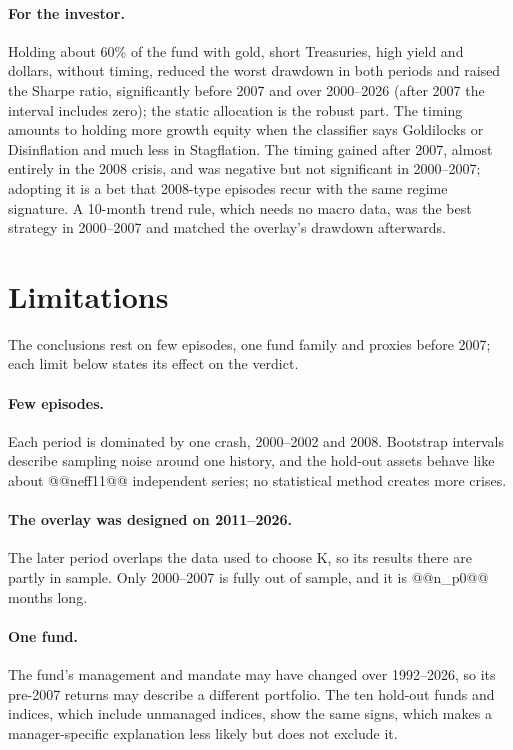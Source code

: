\documentclass[11pt,a4paper]{article}
\begin{document}
\paragraph{For the investor.} Holding about 60\% of the fund with gold, short Treasuries, high yield and dollars,
without timing, reduced the worst drawdown in both periods and raised the Sharpe ratio, significantly before
2007 and over 2000--2026 (after 2007 the interval includes zero); the static allocation is the robust part.
The timing amounts to holding more growth equity when the classifier says Goldilocks or Disinflation and much less in Stagflation. The timing gained after 2007, almost entirely in the 2008 crisis, and was negative but not significant in 2000--2007; adopting it is a bet that 2008-type episodes recur with the same regime signature. A 10-month trend rule, which needs no macro data, was the best strategy in
2000--2007 and matched the overlay's drawdown afterwards.

\section{Limitations}

The conclusions rest on few episodes, one fund family and proxies before 2007; each limit below states its effect on the verdict.


\paragraph{Few episodes.} Each period is dominated by one crash, 2000--2002 and 2008. Bootstrap intervals describe
sampling noise around one history, and the hold-out assets behave like about @@neff11@@ independent series; no
statistical method creates more crises.

\paragraph{The overlay was designed on 2011--2026.} The later period overlaps the data used to choose K, so its
results there are partly in sample. Only 2000--2007 is fully out of sample, and it is @@n_p0@@ months long.

\paragraph{One fund.} The fund's management and mandate may have changed over 1992--2026, so its pre-2007 returns may describe a
different portfolio. The ten hold-out funds and indices, which include unmanaged indices, show the same signs, which makes a
manager-specific explanation less likely but does not exclude it.
\end{document}

